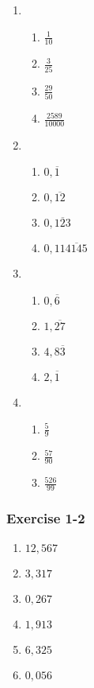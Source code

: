 {\begin{multicols}{3}
\begin{enumerate}[noitemsep, label=\textbf{\arabic*}. ]
 \item %
    \begin{enumerate}[noitemsep, label=\textbf{(\alph*)} ] 
    \item $\frac{1}{10}$
    \item $\frac{3}{25}$%
    \item $\frac{29}{50}$%
    \item $\frac{2589}{10000}$%
    \end{enumerate}
\item%
    \begin{enumerate}[noitemsep, label=\textbf{(\alph*)} ] 
    \item $0,\overline{1}$%
    \item $0,\overline{12}$%
    \item $0,\overline{123}$%
    \item $0,11\overline{4145}$%
    \end{enumerate}
\item %
    \begin{enumerate}[noitemsep, label=\textbf{(\alph*)} ] 
    \item $0,\overline{6}$%
    \item $1,\overline{27}$%
    \item $4,8\overline{3}$%
    \item $2,\overline{1}$%
    \end{enumerate}
\item %
    \begin{enumerate}[noitemsep, label=\textbf{(\alph*)} ] 
    \item $\frac{5}{9}$%
    \item $\frac{57}{90}$%
    \item $\frac{526}{99}$%
    \end{enumerate}
\end{enumerate}

\subsubsection*{Exercise 1-2} %

\begin{enumerate}[noitemsep, label=\textbf{\arabic*}. ]
\item $12,567$%
\item $3,317$%
\item $0,267$%
\item $1,913$
\item $6,325$%
\item $0,056$%
\end{enumerate}



\end{multicols}}
